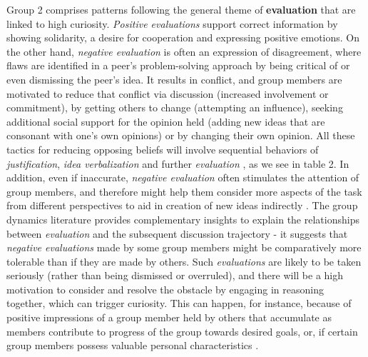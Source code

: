\documentclass{llncs}
\begin{document}
Group 2 comprises patterns following the general theme of {\bf evaluation} that are linked to high curiosity. {\em Positive evaluations} support correct information by showing solidarity, a desire for cooperation and expressing positive emotions. On the other hand, {\em negative evaluation} is often an expression of disagreement, where flaws are identified in a peer's problem-solving approach by being critical of or even dismissing the peer's idea. It results in conflict, and group members are motivated to reduce that conflict via discussion (increased involvement or commitment), by getting others to change (attempting an influence), seeking additional social support for the opinion held (adding new ideas that are consonant with one's own opinions) or by changing their own opinion. All these tactics for reducing opposing beliefs will involve sequential behaviors of {\em justification}, {\em idea verbalization} and further {\em evaluation} \cite{chiu2008flowing}, as we see in table 2. In addition, even if inaccurate, {\em negative evaluation} often stimulates the attention of group members, and therefore might help them consider more aspects of the task from different perspectives to aid in creation of new ideas indirectly \cite{orlitzky2001err}. The group dynamics literature provides complementary insights to explain the relationships between {\em evaluation} and the subsequent discussion trajectory - it suggests that {\em negative evaluations} made by some group members might be comparatively more tolerable than if they are made by others. Such {\em evaluations} are likely to be taken seriously (rather than being dismissed or overruled), and there will be a high motivation to consider and resolve the obstacle by engaging in reasoning together, which can trigger curiosity. This can happen, for instance, because of positive impressions of a group member held by others that accumulate as members contribute to progress of the group towards desired goals, or, if certain group members possess valuable personal characteristics \cite{cartwright1953group}.
\vspace{-0.05cm}
\end{document}

